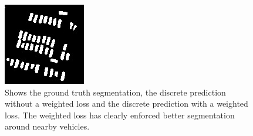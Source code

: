 \documentclass{kththesis}
\begin{document}
\begin{figure}[H]
\endminipage\hfill
{}%
  \includegraphics[width=\linewidth]{class_vs_w/weight_1}
\endminipage
\caption{Shows the ground truth segmentation, the discrete prediction without a weighted loss and the discrete prediction with a weighted loss. The weighted loss has clearly enforced better segmentation around nearby vehicles.}
\end{figure}
\end{document}
